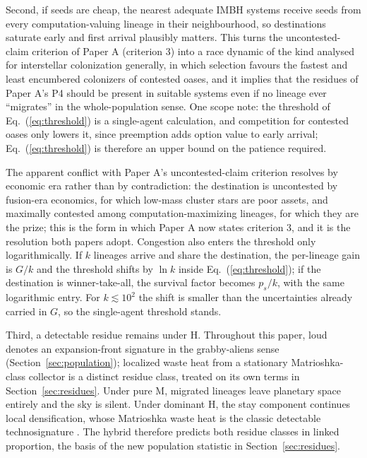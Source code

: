 \documentclass[11pt]{article}
\begin{document}
Second, if seeds are cheap, the nearest adequate IMBH systems receive seeds from every computation-valuing lineage in their neighbourhood, so destinations saturate early and first arrival plausibly matters. This turns the uncontested-claim criterion of Paper A (criterion 3) into a race dynamic of the kind \citet{Hanson1998} analysed for interstellar colonization generally, in which selection favours the fastest and least encumbered colonizers of contested oases, and it implies that the residues of Paper A's P4 should be present in suitable systems even if no lineage ever ``migrates'' in the whole-population sense. One scope note: the threshold of Eq.~(\ref{eq:threshold}) is a single-agent calculation, and competition for contested oases only lowers it, since preemption adds option value to early arrival; Eq.~(\ref{eq:threshold}) is therefore an upper bound on the patience required.

The apparent conflict with Paper A's uncontested-claim criterion resolves by economic era rather than by contradiction: the destination is uncontested by fusion-era economics, for which low-mass cluster stars are poor assets, and maximally contested among computation-maximizing lineages, for which they are the prize; this is the form in which Paper A now states criterion 3, and it is the resolution both papers adopt. Congestion also enters the threshold only logarithmically. If $k$ lineages arrive and share the destination, the per-lineage gain is $G/k$ and the threshold shifts by $\ln k$ inside Eq.~(\ref{eq:threshold}); if the destination is winner-take-all, the survival factor becomes $p_{s}/k$, with the same logarithmic entry. For $k \lesssim 10^{2}$ the shift is smaller than the uncertainties already carried in $G$, so the single-agent threshold stands.

Third, a detectable residue remains under H. Throughout this paper, loud denotes an expansion-front signature in the grabby-aliens sense (Section~\ref{sec:population}); localized waste heat from a stationary Matrioshka-class collector is a distinct residue class, treated on its own terms in Section~\ref{sec:residues}. Under pure M, migrated lineages leave planetary space entirely and the sky is silent. Under dominant H, the stay component continues local densification, whose Matrioshka waste heat is the classic detectable technosignature \citep{Dyson1960,Wright2014}. The hybrid therefore predicts both residue classes in linked proportion, the basis of the new population statistic in Section~\ref{sec:residues}.
\end{document}
